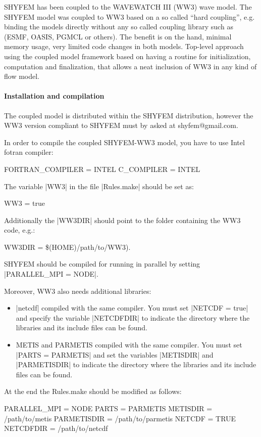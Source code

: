 SHYFEM has been coupled to the WAVEWATCH III (WW3) wave model.
The SHYFEM model was coupled to WW3 based on a so called ``hard coupling'', e.g.
binding the models directly without any so called coupling library such as
(ESMF, OASIS, PGMCL or others). The benefit is on the hand, minimal memory
usage, very limited code changes in both models. Top-level approach using the
coupled model framework based on having a routine for initialization,
computation and finalization, that allows a neat inclusion of WW3 in any kind
of flow model.

\paragraph{Installation and compilation}

The coupled model is distributed within the SHYFEM distribution, however the WW3 version
compliant to SHYFEM must by asked at shyfem@gmail.com.

In order to compile the coupled SHYFEM-WW3 model, you have to use Intel fotran compiler:
\begin{code}
FORTRAN_COMPILER = INTEL
C_COMPILER = INTEL
\end{code}
The variable |WW3| in the file |Rules.make| should be set as:
\begin{code}
WW3 = true
\end{code}
Additionally the |WW3DIR| should point to the folder containing the WW3 code, e.g.:
\begin{code}
WW3DIR = \$(HOME)/path/to/WW3). 
\end{code}
SHYFEM should be compiled for running in parallel by setting 
|PARALLEL_MPI = NODE|.

Moreover, WW3 also needs additional libraries:
\begin{itemize}
\item |netcdf| compiled with the same compiler.  You must set |NETCDF = true|
and specify the variable |NETCDFDIR| to indicate the directory where the 
libraries and its include files can be found.
\item METIS and PARMETIS compiled with the same compiler. You must set
|PARTS = PARMETIS| and set the variables |METISDIR| and |PARMETISDIR|
to indicate the directory where the libraries and its include files can be
found.
\end{itemize}
At the end the Rules.make should be modified as follows:
\begin{code}
PARALLEL_MPI = NODE
PARTS = PARMETIS
METISDIR = /path/to/metis
PARMETISDIR = /path/to/parmetis
NETCDF = TRUE
NETCDFDIR = /path/to/netcdf
\end{code}

